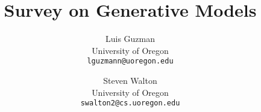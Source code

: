 \documentclass[final]{cvpr}
\begin{document}
\title{Survey on Generative Models}

\author{Luis Guzman \\
University of Oregon\\
{\tt\small lguzmann@uoregon.edu}
\and
Steven Walton\\
University of Oregon\\

{\tt\small swalton2@cs.uoregon.edu}
}

\maketitle


\begin{abstract}
\end{abstract}

%


{\small

%

}
\end{document}
